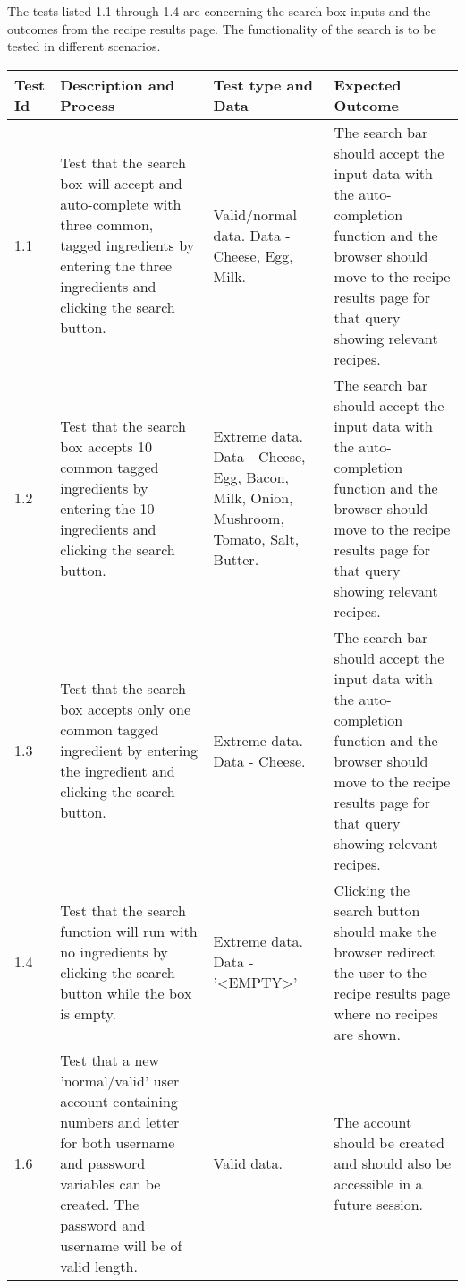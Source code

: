 The tests listed 1.1 through 1.4 are concerning the search box inputs and the outcomes from the recipe results page. The functionality of the search is to be tested in different scenarios. 

    \begin{tabular}{ | l | p{4cm} |  p{4cm} | p{4cm} |}
    \hline
    Test Id	& Description and Process &	Test type and Data &	Expected Outcome \\ \hline
    
    1.1 &	Test that the search box will accept and auto-complete with three common, tagged ingredients by entering the three ingredients and clicking the search button. &	Valid/normal data.
Data - Cheese, Egg, Milk. &	The search bar should accept the input data with the auto-completion function and the browser should move to the recipe results page for that query showing relevant recipes.\\ \hline


1.2	& Test that the search box accepts 10 common tagged ingredients by entering the 10 ingredients and clicking the search button. &	Extreme data.
Data - Cheese, Egg, Bacon, Milk, Onion, Mushroom, Tomato, Salt, Butter. &	The search bar should accept the input data with the auto-completion function and the browser should move to the recipe results page for that query showing relevant recipes.\\ \hline


1.3	& Test that the search box accepts only one common tagged ingredient by entering the ingredient and clicking the search button.	& Extreme data. 
Data - Cheese. &	The search bar should accept the input data with the auto-completion function and the browser should move to the recipe results page for that query showing relevant recipes.\\ \hline

1.4	& Test that the search function will run with no ingredients by clicking the search button while the box is empty. &	Extreme data.
Data - '<EMPTY>' &	Clicking the search button should make the browser redirect the user to the recipe results page where no recipes are shown.\\ \hline

1.6	& Test that a new 'normal/valid' user account containing numbers and letter for both username and password variables can be created. The password and username will be of valid length. &	Valid data.
&	The account should be created and should also be accessible in a future session.\\ \hline


\end{tabular}
